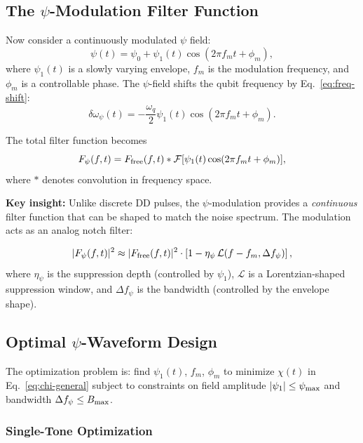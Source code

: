 \documentclass[aps,prd,twocolumn,superscriptaddress,nofootinbib]{revtex4-2}
\begin{document}
\subsection{The $\psi$-Modulation Filter Function}

Now consider a continuously modulated $\psi$ field:
\begin{equation}\label{eq:psi-modulation}
\psi(t) = \psi_0 + \psi_1(t)\cos(2\pi f_m t + \phi_m),
\end{equation}
where $\psi_1(t)$ is a slowly varying envelope, $f_m$ is the modulation
frequency, and $\phi_m$ is a controllable phase. The $\psi$-field shifts
the qubit frequency by Eq.~\eqref{eq:freq-shift}:
\begin{equation}
\delta\omega_\psi(t) = -\frac{\omega_q}{2}\psi_1(t)\cos(2\pi f_m t + \phi_m).
\end{equation}

The total filter function becomes
\begin{equation}
F_\psi(f,t) = F_{\rm free}(f,t) * \mathcal{F}[\psi_1(t)\cos(2\pi f_m t + \phi_m)],
\end{equation}
where $*$ denotes convolution in frequency space.

\textbf{Key insight:} Unlike discrete DD pulses, the $\psi$-modulation
provides a \emph{continuous} filter function that can be shaped to match
the noise spectrum. The modulation acts as an analog notch filter:

\begin{equation}\label{eq:psi-filter}
|F_\psi(f,t)|^2 \approx |F_{\rm free}(f,t)|^2 \cdot
\left[1 - \eta_\psi\,\mathcal{L}(f - f_m, \Delta f_\psi)\right],
\end{equation}
where $\eta_\psi$ is the suppression depth (controlled by $\psi_1$),
$\mathcal{L}$ is a Lorentzian-shaped suppression window, and $\Delta f_\psi$
is the bandwidth (controlled by the envelope shape).

\subsection{Optimal $\psi$-Waveform Design}

The optimization problem is: find $\psi_1(t)$, $f_m$, $\phi_m$ to
minimize $\chi(t)$ in Eq.~\eqref{eq:chi-general} subject to constraints
on field amplitude $|\psi_1| \leq \psi_{\rm max}$ and bandwidth
$\Delta f_\psi \leq B_{\rm max}$.

\subsubsection{Single-Tone Optimization}
\end{document}
